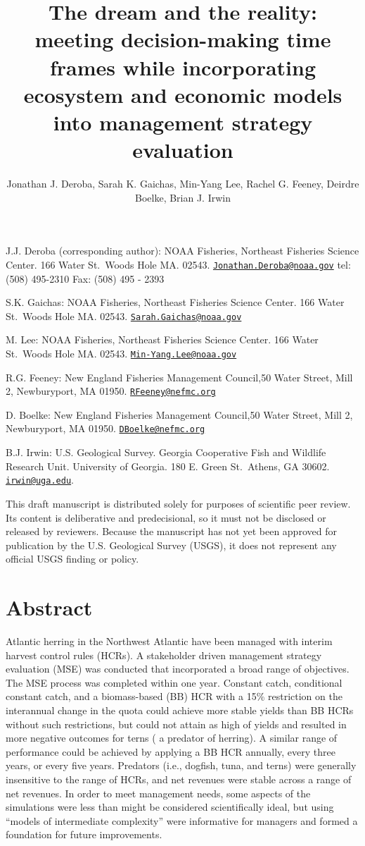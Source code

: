 \documentclass[]{article}
\title{The dream and the reality: meeting decision-making time frames while
incorporating ecosystem and economic models into management strategy
evaluation}
\author{Jonathan J. Deroba, Sarah K. Gaichas, Min-Yang Lee, Rachel G. Feeney,
Deirdre Boelke, Brian J. Irwin}
\date{}
\begin{document}
\maketitle

\doublespacing
J.J. Deroba (corresponding author): NOAA Fisheries, Northeast Fisheries
Science Center. 166 Water St.~Woods Hole MA. 02543.
\href{mailto:Jonathan.Deroba@noaa.gov}{\nolinkurl{Jonathan.Deroba@noaa.gov}}
tel: (508) 495-2310 Fax: (508) 495 - 2393

S.K. Gaichas: NOAA Fisheries, Northeast Fisheries Science Center. 166
Water St.~Woods Hole MA. 02543.
\href{mailto:Sarah.Gaichas@noaa.gov}{\nolinkurl{Sarah.Gaichas@noaa.gov}}

M. Lee: NOAA Fisheries, Northeast Fisheries Science Center. 166 Water
St.~Woods Hole MA. 02543.
\href{mailto:Min-Yang.Lee@noaa.gov}{\nolinkurl{Min-Yang.Lee@noaa.gov}}

R.G. Feeney: New England Fisheries Management Council,50 Water Street,
Mill 2, Newburyport, MA 01950.
\href{mailto:RFeeney@nefmc.org}{\nolinkurl{RFeeney@nefmc.org}}

D. Boelke: New England Fisheries Management Council,50 Water Street,
Mill 2, Newburyport, MA 01950.
\href{mailto:DBoelke@nefmc.org}{\nolinkurl{DBoelke@nefmc.org}}

B.J. Irwin: U.S. Geological Survey. Georgia Cooperative Fish and
Wildlife Research Unit. University of Georgia. 180 E. Green St.~Athens,
GA 30602. \href{mailto:irwin@uga.edu}{\nolinkurl{irwin@uga.edu}}.

This draft manuscript is distributed solely for purposes of scientific
peer review. Its content is deliberative and predecisional, so it must
not be disclosed or released by reviewers. Because the manuscript has
not yet been approved for publication by the U.S. Geological Survey
(USGS), it does not represent any official USGS finding or policy.
\newpage

\section{Abstract}\label{abstract}

Atlantic herring in the Northwest Atlantic have been managed with
interim harvest control rules (HCRs). A stakeholder driven management
strategy evaluation (MSE) was conducted that incorporated a broad range
of objectives. The MSE process was completed within one year. Constant
catch, conditional constant catch, and a biomass-based (BB) HCR with a
15\% restriction on the interannual change in the quota could achieve
more stable yields than BB HCRs without such restrictions, but could not
attain as high of yields and resulted in more negative outcomes for
terns ( a predator of herring). A similar range of performance could be
achieved by applying a BB HCR annually, every three years, or every five
years. Predators (i.e., dogfish, tuna, and terns) were generally
insensitive to the range of HCRs, and net revenues were stable across a
range of net revenues. In order to meet management needs, some aspects
of the simulations were less than might be considered scientifically
ideal, but using ``models of intermediate complexity'' were informative
for managers and formed a foundation for future improvements.
\end{document}
